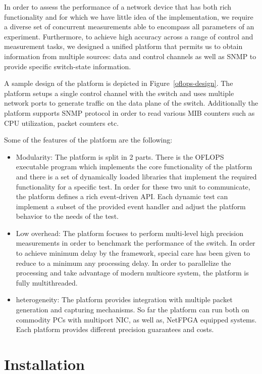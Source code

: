 \documentclass{book}
\begin{document}
In order to assess the performance of a network device that has both
rich functionality and for which we have little idea of the
implementation, we require a diverse set of concurrent measurements
able to encompass all parameters of an experiment. Furthermore,
to achieve high accuracy across a range of control and measurement
tasks, we designed a unified platform that permits us to obtain
information from multiple sources: data and control channels as well
as SNMP to provide specific switch-state information.

A sample design of the platform is
depicted in Figure~\ref{oflops-design}. The platform setups a single control
channel with the switch and uses multiple network ports to generate traffic on
the data plane of the switch. Additionally the platform supports SNMP protocol
in order to read various MIB counters such as CPU utilization, packet counters
etc. 

Some of the features of the platform are the following:
\begin{itemize}
\item Modularity: The platform is split in 2 parts. There is the OFLOPS executable
program which implements the core functionality of the platform and there is a
set of dynamically loaded libraries that implement the required functionality
for a specific test. In order for these two unit to communicate, the platform
defines a rich event-driven API. Each dynamic test can implement a subset of the
provided event handler and adjust the platform behavior to the needs of the
test.
\item Low overhead: The platform focuses to perform multi-level high precision
measurements in order to benchmark the performance of the switch. In order to
achieve minimum delay by the framework, special care has been given to reduce to
a minimum any processing delay. In order to parallelize the processing and
take advantage of modern multicore system, the platform is fully multithreaded.  
\item heterogeneity: The platform provides integration with multiple packet
generation and capturing mechanisms. So far the platform can run both on commodity
PCs with multiport NIC, as well as, NetFPGA equipped systems. Each platform
provides different precision guarantees and costs. 
\end{itemize}

\chapter{Installation}
\end{document}
